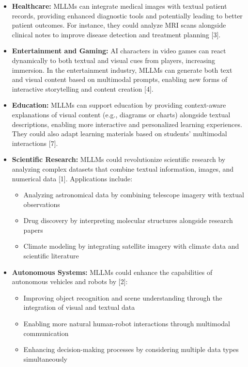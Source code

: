 \begin{itemize}
    \item \textbf{Healthcare:} MLLMs can integrate medical images with textual patient records, providing enhanced diagnostic tools and potentially leading to better patient outcomes. For instance, they could analyze MRI scans alongside clinical notes to improve disease detection and treatment planning [3].
    
    \item \textbf{Entertainment and Gaming:} AI characters in video games can react dynamically to both textual and visual cues from players, increasing immersion. In the entertainment industry, MLLMs can generate both text and visual content based on multimodal prompts, enabling new forms of interactive storytelling and content creation [4].
    
    \item \textbf{Education:} MLLMs can support education by providing context-aware explanations of visual content (e.g., diagrams or charts) alongside textual descriptions, enabling more interactive and personalized learning experiences. They could also adapt learning materials based on students' multimodal interactions [7].
    
    \item \textbf{Scientific Research:} MLLMs could revolutionize scientific research by analyzing complex datasets that combine textual information, images, and numerical data [1]. Applications include:
    \begin{itemize}
        \item Analyzing astronomical data by combining telescope imagery with textual observations
        \item Drug discovery by interpreting molecular structures alongside research papers
        \item Climate modeling by integrating satellite imagery with climate data and scientific literature
    \end{itemize}
    
    \item \textbf{Autonomous Systems:} MLLMs could enhance the capabilities of autonomous vehicles and robots by [2]:
    \begin{itemize}
        \item Improving object recognition and scene understanding through the integration of visual and textual data
        \item Enabling more natural human-robot interactions through multimodal communication
        \item Enhancing decision-making processes by considering multiple data types simultaneously
    \end{itemize}
    

\end{itemize}

